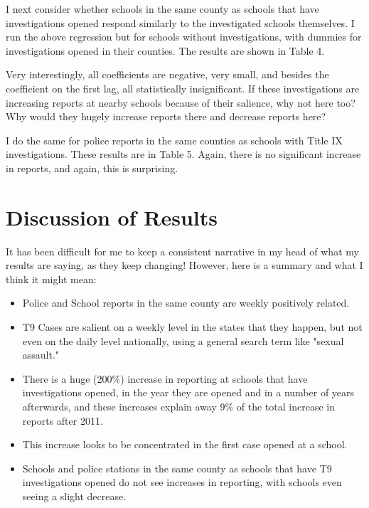 \documentclass[AER,draftmode]{AEA}
\begin{document}
I next consider whether schools in the same county as schools that have investigations opened respond similarly to the investigated schools themselves. I run the above regression but for schools without investigations, with dummies for investigations opened in their counties. The results are shown in Table 4. 

Very interestingly, all coefficients are negative, very small, and besides the coefficient on the first lag, all statistically insignificant. If these investigations are increasing reports at nearby schools because of their salience, why not here too? Why would they hugely increase reports there and decrease reports here?

I do the same for police reports in the same counties as schools with Title IX investigations. These results are in Table 5. Again, there is no significant increase in reports, and again, this is surprising. 

\section{Discussion of Results}

It has been difficult for me to keep a consistent narrative in my head of what my results are saying, as they keep changing! However, here is a summary and what I think it might mean:

\begin{itemize}
    \item Police and School reports in the same county are weekly positively related.
    \item T9 Cases are salient on a weekly level in the states that they happen, but not even on the daily level nationally, using a general search term like "sexual assault." 
    \item There is a huge (200\%) increase in reporting at schools that have investigations opened, in the year they are opened and in a number of years afterwards, and these increases explain away 9\% of the total increase in reports after 2011.
    \item This increase looks to be concentrated in the first case opened at a school.
    \item Schools and police stations in the same county as schools that have T9 investigations opened do not see increases in reporting, with schools even seeing a slight decrease.
\end{itemize}
\end{document}
